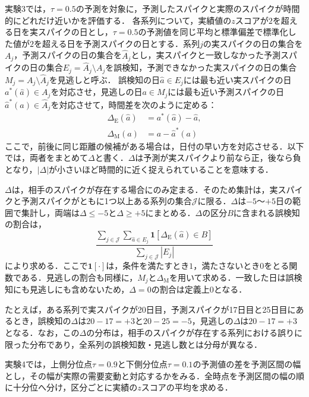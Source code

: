 \documentclass[twocolumn, lastpage]{jarticle}
\newif\ifrevmark
\newcommand{\revBblock}[1]{\ifrevmark{\color{red}#1}\else#1\fi}
\begin{document}
実験3では，$\tau=0.5$の予測を対象に，予測したスパイクと実際のスパイクが時間的にどれだけ近いかを評価する．
\revBblock{各系列について，実績値の$z$スコアが$2$を超える日を実スパイクの日とし，$\tau=0.5$の予測値を同じ平均と標準偏差で標準化した値が$2$を超える日を予測スパイクの日とする．系列$j$の実スパイクの日の集合を$A_j$，予測スパイクの日の集合を$\hat{A}_j$とし，実スパイクと一致しなかった予測スパイクの日の集合$E_j = \hat{A}_j \setminus A_j$を誤検知，予測できなかった実スパイクの日の集合$M_j = A_j \setminus \hat{A}_j$を見逃しと呼ぶ．
誤検知の日$\hat{a} \in E_j$には最も近い実スパイクの日$a^{*}(\hat{a}) \in A_j$を対応させ，見逃しの日$a \in M_j$には最も近い予測スパイクの日$\hat{a}^{*}(a) \in \hat{A}_j$を対応させて，時間差を次のように定める：
    \begin{align}
        \Delta_{\mathrm{E}}(\hat{a}) &= a^{*}(\hat{a}) - \hat{a}, \label{eq:delta} \\
        \Delta_{\mathrm{M}}(a) &= a - \hat{a}^{*}(a)
    \end{align}
ここで，前後に同じ距離の候補がある場合は，日付の早い方を対応させる．以下では，両者をまとめて$\Delta$と書く．$\Delta$は予測が実スパイクより前なら正，後なら負となり，$|\Delta|$が小さいほど時間的に近く捉えられていることを意味する．

$\Delta$は，相手のスパイクが存在する場合にのみ定まる．そのため集計は，実スパイクと予測スパイクがともに1つ以上ある系列の集合$\mathcal{J}$に限る．$\Delta$は$-5$〜$+5$日の範囲で集計し，両端は$\Delta \leq -5$と$\Delta \geq +5$にまとめる．$\Delta$の区分$B$に含まれる誤検知の割合は，
    \begin{equation}
        \frac{\sum_{j \in \mathcal{J}} \sum_{\hat{a} \in E_j} \mathbf{1}[\Delta_{\mathrm{E}}(\hat{a}) \in B]}{\sum_{j \in \mathcal{J}} |E_j|}
    \end{equation}
により求める．ここで$\mathbf{1}[\cdot]$は，条件を満たすとき$1$，満たさないとき$0$をとる関数である．見逃しの割合も同様に，$M_j$と$\Delta_{\mathrm{M}}$を用いて求める．一致した日は誤検知にも見逃しにも含めないため，$\Delta=0$の割合は定義上$0$となる．

たとえば，ある系列で実スパイクが20日目，予測スパイクが17日目と25日目にあるとき，誤検知の$\Delta$は$20-17=+3$と$20-25=-5$，見逃しの$\Delta$は$20-17=+3$となる．なお，この$\Delta$の分布は，相手のスパイクが存在する系列における誤りに限った分布であり，全系列の誤検知数・見逃し数とは分母が異なる．}

実験4では，上側分位点$\tau=0.9$と下側分位点$\tau=0.1$の予測値の差を予測区間の幅とし，その幅が実際の需要変動と対応するかをみる．全時点を予測区間の幅の順に十分位へ分け，区分ごとに実績の$z$スコアの平均を求める．
\end{document}
